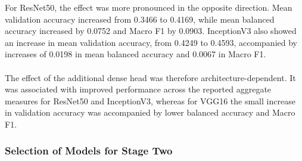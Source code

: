 \documentclass[12pt, a4paper]{report}
\let\oldsubsubsection\subsubsection
\renewcommand{\subsubsection}{%
    \Needspace{6\baselineskip}%
    \oldsubsubsection
}
\begin{document}
					For ResNet50, the effect was more pronounced in the opposite direction. Mean validation accuracy increased from 0.3466 to 0.4169, while mean balanced accuracy increased by 0.0752 and Macro F1 by 0.0903. InceptionV3 also showed an increase in mean validation accuracy, from 0.4249 to 0.4593, accompanied by increases of 0.0198 in mean balanced accuracy and 0.0067 in Macro F1.\\\\
					The effect of the additional dense head was therefore architecture-dependent. It was associated with improved performance across the reported aggregate measures for ResNet50 and InceptionV3, whereas for VGG16 the small increase in validation accuracy was accompanied by lower balanced accuracy and Macro F1.
					
				\subsubsection{Selection of Models for Stage Two}
					
\end{document}
